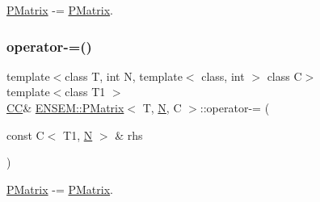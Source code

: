 \mbox{\hyperlink{classENSEM_1_1PMatrix}{P\+Matrix}} -\/= \mbox{\hyperlink{classENSEM_1_1PMatrix}{P\+Matrix}}. 

\mbox{\label{classENSEM_1_1PMatrix_a76fa178c64fa75b73925016654a08766}} 
\subsubsection{\texorpdfstring{operator-\/=()}{operator-=()}\hspace{0.1cm}{\footnotesize\ttfamily [3/6]}}
{\footnotesize\ttfamily template$<$class T, int N, template$<$ class, int $>$ class C$>$ \\
template$<$class T1 $>$ \\
\mbox{\hyperlink{classENSEM_1_1PMatrix_a744bac549029029effe32dc1705660ec}{CC}}\& \mbox{\hyperlink{classENSEM_1_1PMatrix}{E\+N\+S\+E\+M\+::\+P\+Matrix}}$<$ T, \mbox{\hyperlink{adat__devel_2lib_2hadron_2operator__name__util_8cc_a7722c8ecbb62d99aee7ce68b1752f337}{N}}, C $>$\+::operator-\/= (\begin{DoxyParamCaption}\item[{const C$<$ T1, \mbox{\hyperlink{adat__devel_2lib_2hadron_2operator__name__util_8cc_a7722c8ecbb62d99aee7ce68b1752f337}{N}} $>$ \&}]{rhs }\end{DoxyParamCaption})\hspace{0.3cm}{\ttfamily [inline]}}



\mbox{\hyperlink{classENSEM_1_1PMatrix}{P\+Matrix}} -\/= \mbox{\hyperlink{classENSEM_1_1PMatrix}{P\+Matrix}}. 

\mbox{\label{classENSEM_1_1PMatrix_ad33381d53cc105f6f64869316aa0e2c2}} 
